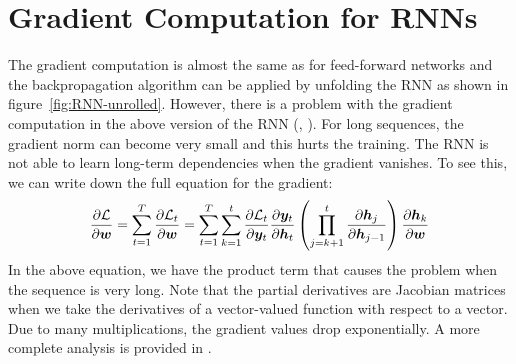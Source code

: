 	\section{Gradient Computation for RNNs}\label{sec:gradient_computation_RNN}
		The gradient computation is almost the same as for feed-forward networks and the backpropagation algorithm can be applied by unfolding the RNN as shown in figure~\ref{fig:RNN-unrolled}.
		However, there is a problem with the gradient computation in the above version of the RNN (\cite{pascanu2013difficulty}, \cite{bengio1994learning}).
		For long sequences, the gradient norm can become very small and this hurts the training.
		The RNN is not able to learn long-term dependencies when the gradient vanishes.
		To see this, we can write down the full equation for the gradient:
		\begin{equation}\label{eq:gradient_computation_RNN}
			\frac{\partial \mathcal{L}}{\partial \bm{w}}
			= \sum_{t=1}^{T} 
				\frac{\partial \mathcal{L}_t}{\partial \bm{w}}
			= \sum_{t=1}^{T} 
				\sum_{k=1}^{t} 
					\frac{\partial \mathcal{L}_t}{\partial \bm{y}_t}
					\frac{\partial \bm{y}_t}{\partial \bm{h}_t}
					\left(
						\prod_{j=k+1}^{t} \frac{\partial \bm{h}_j}{\partial \bm{h}_{j-1}}
					\right)
					\frac{\partial \bm{h}_{k}}{\partial \bm{w}}
		\end{equation}
		In the above equation, we have the product term that causes the problem when the sequence is very long.
		Note that the partial derivatives are Jacobian matrices when we take the derivatives of a vector-valued function with respect to a vector.
		Due to many multiplications, the gradient values drop exponentially.
		A more complete analysis is provided in \cite{pascanu2013difficulty}.
		
